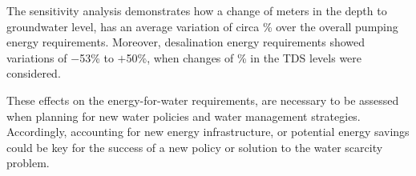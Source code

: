 The sensitivity analysis demonstrates how a change of  meters in the depth to groundwater level, has an average variation of circa \% over the overall pumping energy requirements. Moreover, desalination energy requirements showed variations of $-$53\% to $+$50\%, when changes of \% in the TDS levels were considered.

These effects on the energy-for-water requirements, are necessary to be assessed when planning for new water policies and water management strategies. Accordingly, accounting for new energy infrastructure, or potential energy savings could be key for the success of a new policy or solution to the water scarcity problem.